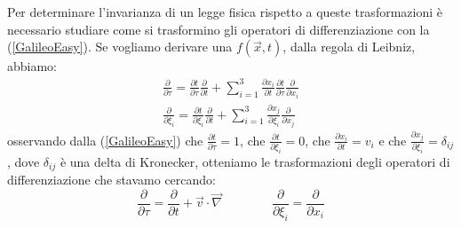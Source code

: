 Per determinare l'invarianza di un legge fisica rispetto a queste trasformazioni è necessario studiare come si trasformino gli operatori di differenziazione con la  (\ref{GalileoEasy}). Se vogliamo derivare una $f(\vec{x},t)$, dalla regola di Leibniz, abbiamo:
\begin{equation*}
	\begin{gathered}
		\frac{\partial}{\partial \tau}=\frac{\partial t}{\partial \tau}\frac{\partial}{\partial t}+\sum_{i=1}^{3}\frac{\partial x_i}{\partial t}\frac{\partial t}{\partial \tau}\frac{\partial}{\partial x_i} \\
		\frac{\partial}{\partial \xi_i}=\frac{\partial t}{\partial \xi_i}\frac{\partial}{\partial t}+\sum_{i=1}^{3}\frac{\partial x_j}{\partial \xi_i}\frac{\partial}{\partial x_j}
	\end{gathered}
\end{equation*}
osservando dalla (\ref{GalileoEasy}) che $\frac{\partial t}{\partial \tau}=1$, che $\frac{\partial t}{\partial \xi_i}=0$, che $\frac{\partial x_i}{\partial t}=v_i$ e che $\frac{\partial x_j}{\partial \xi_i}=\delta_{ij}$, dove $\delta_{ij}$ è una delta di Kronecker, otteniamo le trasformazioni degli operatori di differenziazione che stavamo cercando:
\begin{equation}
	\frac{\partial}{\partial \tau}=\frac{\partial}{\partial t}+\vec{v}\cdot\vec{\nabla} \qquad \qquad
	\frac{\partial}{\partial \xi_i}=\frac{\partial}{\partial x_i}
\end{equation}
\newpage